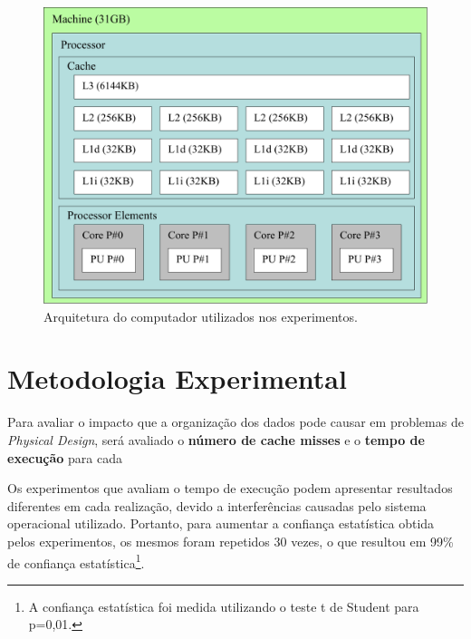 \begin{figure}[ht]
    \centering
    \includegraphics[width=0.5\linewidth]{img/results/architectureMemoryZeus.pdf}
    \caption{Arquitetura do computador utilizados nos experimentos.}
    \label{fig:architectureMemoryZeus}
\end{figure}


\section{Metodologia Experimental}
\label{sec:metodologia_experimental}

Para avaliar o impacto que a organização dos dados pode causar em problemas de \textit{Physical Design}, será avaliado o \textbf{número de cache misses} e o \textbf{tempo de execução} para cada 

Os experimentos que avaliam o tempo de execução podem apresentar resultados diferentes em cada realização, devido a interferências causadas pelo sistema operacional utilizado. Portanto, para aumentar a confiança estatística obtida pelos experimentos, os mesmos foram repetidos 30 vezes, o que resultou em 99\% de confiança estatística\footnote{A confiança estatística foi medida utilizando o teste t de Student para p=0,01.}.














